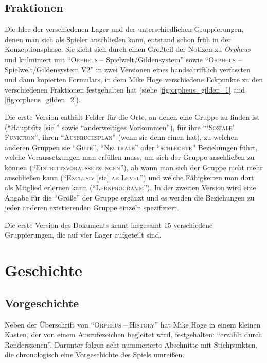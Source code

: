 \documentclass[a5paper,pagesize,numbers=noenddot]{scrbook}
\begin{document}
\clearpage
\subsection{Fraktionen}\label{sec:orpheus_welt_fraktionen}
Die Idee der verschiedenen Lager und der unterschiedlichen Gruppierungen, denen man sich als Spieler anschließen kann, entstand schon früh in der Konzeptionsphase.
Sie zieht sich durch einen Großteil der Notizen zu \textit{Orpheus} und kulminiert mit \enquote{\textsc{Orpheus} -- Spielwelt/Gildensystem} sowie \enquote{\textsc{Orpheus} -- Spielwelt/Gildensystem V2} in zwei Versionen eines handschriftlich verfassten und dann kopierten Formulars, in dem Mike Hoge verschiedene Eckpunkte zu den verschiedenen Fraktionen festgehalten hat (siehe \autoref{fig:orpheus_gilden_1} and \autoref{fig:orpheus_gilden_2}).

Die erste Version enthält Felder für die Orte, an denen eine Gruppe zu finden ist (\enquote{Hauptsïtz [sic]} sowie \enquote{anderweitiges Vorkommen}), für ihre \enquote{\enquote{\textsc{Soziale}} \textsc{Funktion}}, ihren \enquote{\textsc{Ausbruchsplan}} (wenn sie denn einen hat), zu welchen anderen Gruppen sie \enquote{\textsc{Gute}}, \enquote{\textsc{Neutrale}} oder \enquote{\textsc{schlechte}} Beziehungen führt, welche Voraussetzungen man erfüllen muss, um sich der Gruppe anschließen zu können (\enquote{\textsc{Eintrittsvoraussetzungen}}), ab wann man sich der Gruppe nicht mehr anschließen kann (\enquote{\textsc{Exclusiv} [sic] \textsc{ab Level}}) und welche Fähigkeiten man dort als Mitglied erlernen kann (\enquote{\textsc{Lernprogramm}}).
In der zweiten Version wird eine Angabe für die \enquote{Größe} der Gruppe ergänzt und es werden die Beziehungen zu jeder anderen existierenden Gruppe einzeln spezifiziert.

Die erste Version des Dokuments kennt insgesamt 15 verschiedene Gruppierungen, die auf vier Lager aufgeteilt sind.


\clearpage
\section{Geschichte}\label{sec:orpheus_geschichte}


\subsection{Vorgeschichte}\label{sec:orpheus_geschichte_vorgeschichte}
Neben der Überschrift von \enquote{\textsc{Orpheus -- History}} hat Mike Hoge in einem kleinen Kasten, der von einem Ausrufezeichen begleitet wird, festgehalten:
\enquote{erzählt durch Renderszenen}.
Darunter folgen acht nummerierte Abschnitte mit Stichpunkten, die chronologisch eine Vorgeschichte des Spiels umreißen.
\end{document}
